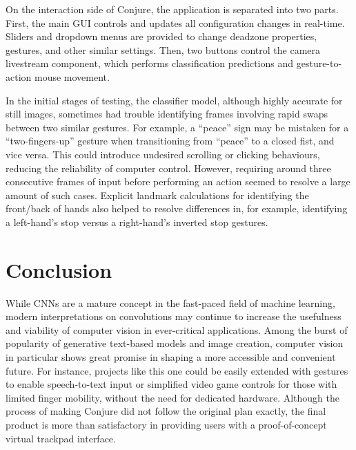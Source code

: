 \documentclass{article}
\begin{document}
On the interaction side of Conjure, the application is separated into two parts. First, the main GUI controls and updates all configuration changes in real-time. Sliders and dropdown menus are provided to change deadzone properties, gestures, and other similar settings. Then, two buttons control the camera livestream component, which performs classification predictions and gesture-to-action mouse movement.

In the initial stages of testing, the classifier model, although highly accurate for still images, sometimes had trouble identifying frames involving rapid swaps between two similar gestures. For example, a ``peace'' sign may be mistaken for a ``two-fingers-up'' gesture when transitioning from ``peace'' to a closed fist, and vice versa. This could introduce undesired scrolling or clicking behaviours, reducing the reliability of computer control. However, requiring around three consecutive frames of input before performing an action seemed to resolve a large amount of such cases. Explicit landmark calculations for identifying the front/back of hands also helped to resolve differences in, for example, identifying a left-hand's stop versus a right-hand's inverted stop gestures.


\section{Conclusion}

While CNNs are a mature concept in the fast-paced field of machine learning, modern interpretations on convolutions may continue to increase the usefulness and viability of computer vision in ever-critical applications. Among the burst of popularity of generative text-based models and image creation, computer vision in particular shows great promise in shaping a more accessible and convenient future. For instance, projects like this one could be easily extended with gestures to enable speech-to-text input or simplified video game controls for those with limited finger mobility, without the need for dedicated hardware. Although the process of making Conjure did not follow the original plan exactly, the final product is more than satisfactory in providing users with a proof-of-concept virtual trackpad interface.



\pagebreak
\nocite{*} %
\printbibliography %
\end{document}
